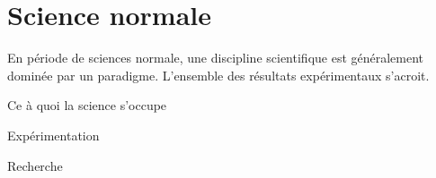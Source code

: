 

\section{Science normale}


En période de sciences normale, une discipline scientifique est généralement dominée par un paradigme. L'ensemble des résultats expérimentaux s'acroit.

Ce à quoi la science s'occupe

Expérimentation

Recherche








